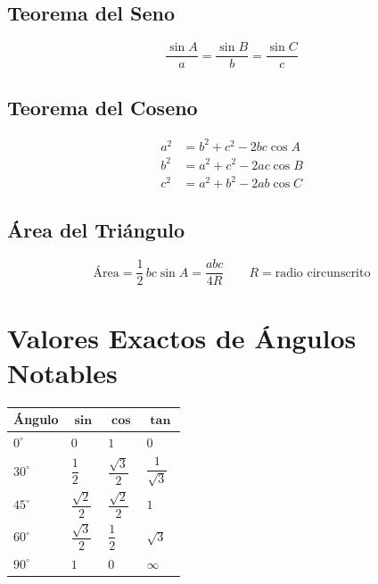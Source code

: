 \documentclass[12pt,a4paper]{article}
\begin{document}
\subsection{Teorema del Seno}

\begin{tcolorbox}[formulabox,
  title={Teorema del Seno --- triángulo $ABC$ oblicuángulo}]
\[
  \frac{\sin A}{a} = \frac{\sin B}{b} = \frac{\sin C}{c}
\]
\end{tcolorbox}

\subsection{Teorema del Coseno}

\begin{tcolorbox}[formulabox, title={Teorema del Coseno}]
\begin{align*}
a^2 &= b^2 + c^2 - 2bc\cos A \\[4pt]
b^2 &= a^2 + c^2 - 2ac\cos B \\[4pt]
c^2 &= a^2 + b^2 - 2ab\cos C
\end{align*}
\end{tcolorbox}

\subsection{Área del Triángulo}

\begin{tcolorbox}[formulabox]
\[
  \text{Área} = \frac{1}{2}\,bc\sin A
              = \frac{abc}{4R}
  \qquad R = \text{radio circunscrito}
\]
\end{tcolorbox}

\section{Valores Exactos de Ángulos Notables}

\begin{center}
\begin{tabular}{>{\centering\bfseries}m{2cm}
                >{\centering}m{3cm}
                >{\centering}m{3cm}
                >{\centering\arraybackslash}m{3cm}}
\toprule
\rowcolor{azulOscuro}
\color{white}\textbf{Ángulo} &
\color{white}$\boldsymbol{\sin}$ &
\color{white}$\boldsymbol{\cos}$ &
\color{white}$\boldsymbol{\tan}$ \\
\midrule
\rowcolor{grisClaro}
$0^\circ$  & $0$ & $1$ & $0$ \\
$30^\circ$ & $\dfrac{1}{2}$ & $\dfrac{\sqrt{3}}{2}$ &
             $\dfrac{1}{\sqrt{3}}$ \\[10pt]
\rowcolor{grisClaro}
$45^\circ$ & $\dfrac{\sqrt{2}}{2}$ & $\dfrac{\sqrt{2}}{2}$ & $1$ \\[10pt]
$60^\circ$ & $\dfrac{\sqrt{3}}{2}$ & $\dfrac{1}{2}$ & $\sqrt{3}$ \\[6pt]
\rowcolor{grisClaro}
$90^\circ$ & $1$ & $0$ & $\infty$ \\
\bottomrule
\end{tabular}
\end{center}
\end{document}
